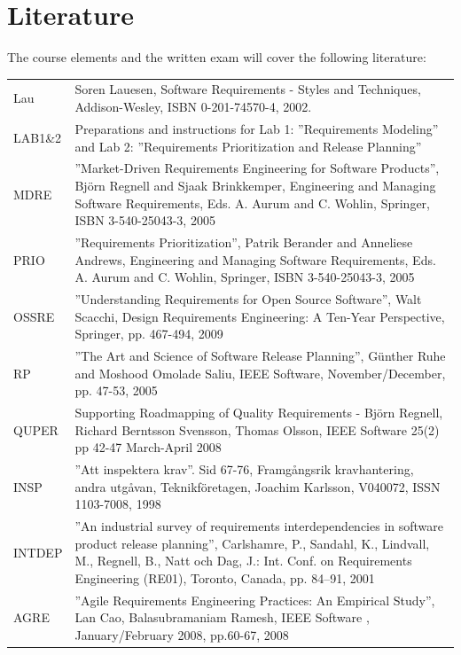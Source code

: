 \documentclass[10pt,a4paper]{article}
\begin{document}
\section{Literature}
The course elements and the written exam will cover the following literature: 
\begin{flushleft}
\setlength{\tabcolsep}{0pt}
\begin{tabular}{p{} p{}}
Lau & Soren Lauesen, Software Requirements - Styles and Techniques, Addison-Wesley, ISBN 0-201-74570-4, 2002. \\
LAB1\&2	&Preparations and instructions for Lab 1: ''Requirements Modeling'' and Lab 2: ''Requirements Prioritization and Release Planning'' \\
MDRE &	''Market-Driven Requirements Engineering for Software Products'', Björn Regnell and Sjaak Brinkkemper, Engineering and Managing Software Requirements, Eds. A. Aurum and C. Wohlin, Springer,  ISBN 3-540-25043-3, 2005 \\
PRIO&	''Requirements Prioritization'', Patrik Berander and Anneliese Andrews, Engineering and Managing Software Requirements, Eds. A. Aurum and C. Wohlin, Springer,  ISBN 3-540-25043-3, 2005 \\
OSSRE & ''Understanding Requirements for Open Source Software'', Walt Scacchi, Design Requirements Engineering: A Ten-Year Perspective, Springer, pp. 467-494, 2009\\
 RP&	''The Art and Science of Software Release Planning'', Günther Ruhe and Moshood Omolade Saliu, IEEE Software, November/December, pp. 47-53, 2005  \\
QUPER&	Supporting Roadmapping of Quality Requirements - Björn Regnell, Richard Berntsson Svensson, 
Thomas Olsson, IEEE Software 25(2) pp 42-47 March-April 2008  \\
INSP&	''Att inspektera krav''. Sid 67-76, Framgångsrik kravhantering, andra utgåvan, Teknikföretagen, Joachim Karlsson, V040072, ISSN 1103-7008, 1998\\
 INTDEP &	''An industrial survey of requirements interdependencies in software product release planning'', Carlshamre, P., Sandahl, K., Lindvall, M., Regnell, B., Natt och Dag, J.: Int. Conf. on Requirements Engineering (RE01), Toronto, Canada, pp. 84–91, 2001 \\
AGRE &	''Agile Requirements Engineering Practices: An Empirical Study'', Lan Cao, Balasubramaniam Ramesh, IEEE Software , January/February 2008, pp.60-67, 2008 \\
\end{tabular}
\end{flushleft}
\end{document}
